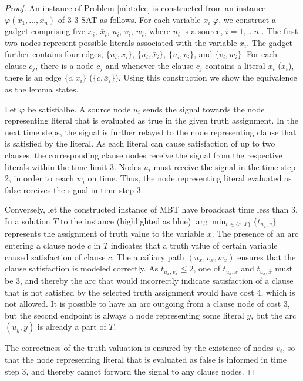 \begin{proof}\label{prop:mbtnpc}
An instance of Problem \ref{mbt:dec} is constructed from an instance $\varphi(x_1,\dots,x_n)$ of \textsc{3-3-SAT} as follows.
For each variable $x_i$ $\varphi$, we construct a gadget comprising five $x_i$, $\bar{x}_i$, $u_i$, $v_i$, $w_i$, where $u_i$ is a source, $i=1,\dots n$ .
The first two nodes represent possible literals associated with the variable $x_i$.
The gadget further contains four edges, $\{u_i,x_i\}$, $\{u_i,\bar{x}_i\}$, $\{u_i,v_i\}$, and $\{v_i,w_i\}$.
For each clause $c_j$, there is a node $c_j$ and whenever the clause $c_j$ contains a literal $x_i$ ($\bar{x}_i$), there is an edge $\{c,x_i\}$ ($\{c,\bar{x}_i\}$).
Using this construction we show the equivalence as the lemma states.

Let $\varphi$ be satisfialbe.
A source node $u_i$ sends the signal towards the node representing literal that is evaluated as true in the given truth assignment.
In the next time steps, the signal is further relayed to the node representing clause that is satisfied by the literal.
As each literal can cause satisfaction of up to two clauses, the corresponding clause nodes receive the signal from the respective literals within the time limit 3.
Nodes $u_i$ must receive the signal in the time step 2, in order to reach $w_i$ on time.
Thus, the node representing literal evaluated as false receives the signal in time step 3.

Conversely, let the constructed instance of MBT have broadcast time less than 3.
In a solution $T$ to the instance (highlighted as blue)  $\arg\min_{v\in\{x,\bar{x}\}}\{t_{u_x,v}\}$ represents the assignment of truth value to the variable $x$.
The presence of an arc entering a clause node $c$ in $T$ indicates that a truth value of certain variable caused satisfaction of clause $c$.
The auxiliary path $(u_x,v_x,w_x)$ ensures that the clause satisfaction is modeled correctly.
As $t_{u_x,v_x}\leq 2$, one of $t_{u_x,x}$ and $t_{u_x,\bar{x}}$ must be 3, 
and thereby the arc that would incorrectly indicate satisfaction of a clause that is not satisfied by the selected truth assignment would have cost 4, which is not allowed.
It is possible to have an arc outgoing from a clause node of cost 3, but the second endpoint is always a node representing some literal $y$, but the arc $(u_y,y)$ is already a part of $T$.

The correctness of the truth valuation is ensured by the existence of nodes $v_i$, so that the node representing literal that is evaluated as false is informed in time step 3, 
and thereby cannot forward the signal to any clause nodes.
\end{proof}

